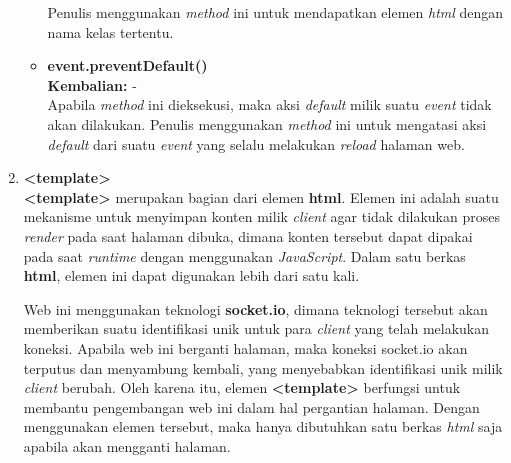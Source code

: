 \begin{enumerate}
\begin{itemize}
		Penulis menggunakan \textit{method} ini untuk mendapatkan elemen \textit{html} dengan nama kelas tertentu.
		
		\item \textbf{event.preventDefault()} \\
		\textbf{Kembalian:} - \\
		Apabila \textit{method} ini dieksekusi, maka aksi \textit{default} milik suatu \textit{event} tidak akan dilakukan. Penulis menggunakan \textit{method} ini untuk mengatasi aksi \textit{default} dari suatu \textit{event} yang selalu melakukan \textit{reload} halaman web.
		
	\end{itemize}
	
	\item \textbf{<template>} \\ 
	\textbf{<template>} merupakan bagian dari elemen \textbf{html}. Elemen ini adalah suatu mekanisme untuk menyimpan konten milik \textit{client} agar tidak dilakukan proses \textit{render} pada saat halaman dibuka, dimana konten tersebut dapat dipakai pada saat \textit{runtime} dengan menggunakan \textit{JavaScript}. Dalam satu berkas \textbf{html}, elemen ini dapat digunakan lebih dari satu kali.
	
	Web ini menggunakan teknologi \textbf{socket.io}, dimana teknologi tersebut akan memberikan suatu identifikasi unik untuk para \textit{client} yang telah melakukan koneksi. Apabila web ini berganti halaman, maka koneksi socket.io akan terputus dan menyambung kembali, yang menyebabkan identifikasi unik milik \textit{client} berubah. Oleh karena itu, elemen \textbf{<template>} berfungsi untuk membantu pengembangan web ini dalam hal pergantian halaman. Dengan menggunakan elemen tersebut, maka hanya dibutuhkan satu berkas \textit{html} saja apabila akan mengganti halaman.
\end{enumerate}

